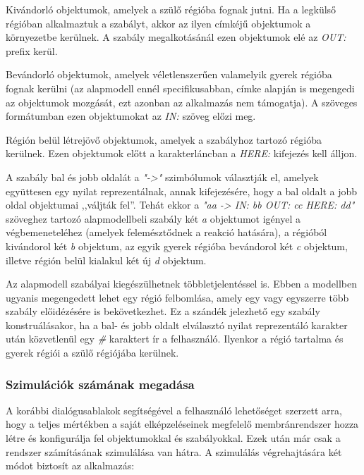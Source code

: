 \begin{compactenum}
	\item Kivándorló objektumok, amelyek a szülő régióba fognak jutni. Ha a legkülső régióban alkalmaztuk a szabályt, akkor az ilyen címkéjű objektumok a környezetbe kerülnek. A szabály megalkotásánál ezen objektumok elé az \textit{OUT:} prefix kerül.
	\item Bevándorló objektumok, amelyek véletlenszerűen valamelyik gyerek régióba fognak kerülni (az alapmodell ennél specifikusabban, címke alapján is megengedi az objektumok mozgását, ezt azonban az alkalmazás nem támogatja). A szöveges formátumban ezen objektumokat az \textit{IN:} szöveg előzi meg.
	\item Régión belül létrejövő objektumok, amelyek a szabályhoz tartozó régióba kerülnek. Ezen objektumok előtt a karakterláncban a \textit{HERE:} kifejezés kell álljon.
\end{compactenum}
A szabály bal és jobb oldalát a \textit{"->"} szimbólumok választják el, amelyek együttesen egy nyilat reprezentálnak, annak kifejezésére, hogy a bal oldalt a jobb oldal objektumai ,,váljták fel''.
Tehát ekkor a \textit{"aa -> IN: bb OUT: cc HERE: dd"} szöveghez tartozó alapmodellbeli szabály két \textit{a} objektumot igényel a végbemeneteléhez (amelyek felemésztődnek a reakció hatására), a régióból kivándorol két \textit{b} objektum, az egyik gyerek régióba bevándorol két \textit{c} objektum, illetve régión belül kialakul két új \textit{d} objektum.

Az alapmodell szabályai kiegészülhetnek többletjelentéssel is. Ebben a modellben ugyanis megengedett lehet egy régió felbomlása, amely egy vagy egyszerre több szabály előidézésére is bekövetkezhet. Ez a szándék jelezhető egy szabály konstruálásakor, ha a bal- és jobb oldalt elválasztó nyilat reprezentáló karakter után közvetlenül egy \textit{\#} karaktert ír a felhasználó. Ilyenkor a régió tartalma és gyerek régiói a szülő régiójába kerülnek.


\subsubsection{Szimulációk számának megadása}

A korábbi dialógusablakok segítségével a felhasználó lehetőséget szerzett arra, hogy a teljes mértékben a saját elképzeléseinek megfelelő membránrendszer hozza létre és konfigurálja fel objektumokkal és szabályokkal. Ezek után már csak a rendszer számításának szimulálása van hátra. A szimulálás végrehajtására két módot biztosít az alkalmazás:

